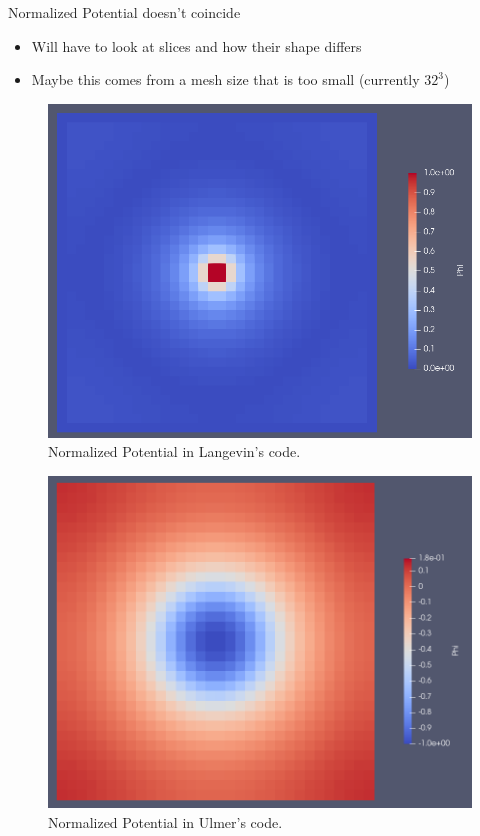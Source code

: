 \begin{frame}{Normalized Potential doesn't coincide}
    \begin{itemize}
        \item Will have to look at slices and how their shape differs
        \item Maybe this comes from a mesh size that is too small (currently $32^3$)
    \end{itemize}
    \begin{multicols}{2}
    \begin{figure}[!htb]
        \centering
        \captionsetup{justification=centering}
      \includegraphics[width=1.03\linewidth]{figures/langevin_phi_normalized.png}
        \caption{Normalized Potential in Langevin's code.}
      \label{fig:awesome_image6}
    \end{figure}
    \columnbreak
    \begin{figure}[!htb]
        \centering
        \captionsetup{justification=centering}
      \includegraphics[width=1.03\linewidth]{figures/p3m_phi_normalized.png}
      \caption{Normalized Potential in Ulmer's code.}
      \label{fig:awesome_image6}
    \end{figure}
    \end{multicols}
\end{frame}


